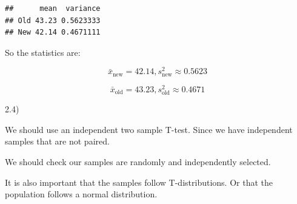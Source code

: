 \documentclass[
]{article}
\newenvironment{Shaded}{\begin{snugshade}}{\end{snugshade}}
\newcommand{\AttributeTok}[1]{\textcolor[rgb]{0.77,0.63,0.00}{#1}}
\newcommand{\DecValTok}[1]{\textcolor[rgb]{0.00,0.00,0.81}{#1}}
\newcommand{\FunctionTok}[1]{\textcolor[rgb]{0.00,0.00,0.00}{#1}}
\newcommand{\NormalTok}[1]{#1}
\newcommand{\OtherTok}[1]{\textcolor[rgb]{0.56,0.35,0.01}{#1}}
\newcommand{\SpecialCharTok}[1]{\textcolor[rgb]{0.00,0.00,0.00}{#1}}
\newcommand{\StringTok}[1]{\textcolor[rgb]{0.31,0.60,0.02}{#1}}
\begin{document}
\begin{Shaded}
\end{Shaded}

\begin{verbatim}
##      mean  variance
## Old 43.23 0.5623333
## New 42.14 0.4671111
\end{verbatim}

So the statistics are:

\[
\bar{x}_\text{new} = 42.14 , s_\text{new}^2 \approx 0.5623
\]

\[
\bar{x}_\text{old} = 43.23 , s_\text{old}^2 \approx 0.4671 
\]

2.4)

We should use an independent two sample T-test. Since we have
independent samples that are not paired.

We should check our samples are randomly and independently selected.

It is also important that the samples follow T-distributions. Or that
the population follows a normal distribution.
\end{document}

